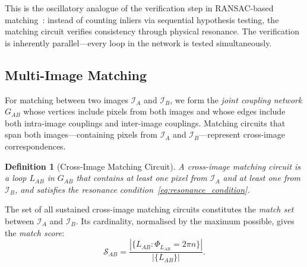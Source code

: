 \documentclass[11pt,twocolumn,a4paper]{article}
\newtheorem{definition}[theorem]{Definition}
\begin{document}
This is the oscillatory analogue of the verification step in RANSAC-based matching~\citep{lowe2004}: instead of counting inliers via sequential hypothesis testing, the matching circuit verifies consistency through physical resonance. The verification is inherently parallel---every loop in the network is tested simultaneously.

\subsection{Multi-Image Matching}

For matching between two images $\mathcal{I}_A$ and $\mathcal{I}_B$, we form the \emph{joint coupling network} $G_{AB}$ whose vertices include pixels from both images and whose edges include both intra-image couplings and inter-image couplings. Matching circuits that span both images---containing pixels from $\mathcal{I}_A$ and $\mathcal{I}_B$---represent cross-image correspondences.

\begin{definition}[Cross-Image Matching Circuit]\label{def:cross_circuit}
A cross-image matching circuit is a loop $L_{AB}$ in $G_{AB}$ that contains at least one pixel from $\mathcal{I}_A$ and at least one from $\mathcal{I}_B$, and satisfies the resonance condition~\eqref{eq:resonance_condition}.
\end{definition}

The set of all sustained cross-image matching circuits constitutes the \emph{match set} between $\mathcal{I}_A$ and $\mathcal{I}_B$. Its cardinality, normalised by the maximum possible, gives the \emph{match score}:
\begin{equation}
    \mathcal{S}_{AB} = \frac{|\{L_{AB} : \Phi_{L_{AB}} = 2\pi n\}|}{|\{L_{AB}\}|}.
    \label{eq:match_score}
\end{equation}
\end{document}
